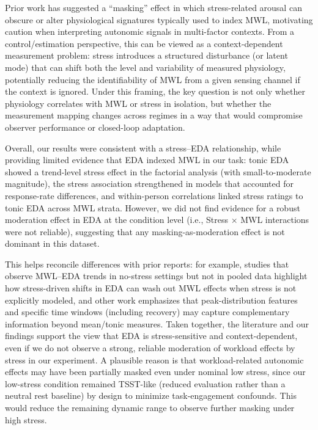 \documentclass[lettersize,journal]{IEEEtran}
\begin{document}
Prior work has suggested a “masking” effect in which stress-related arousal can obscure or alter physiological signatures typically used to index MWL, motivating caution when interpreting autonomic signals in multi-factor contexts. From a control/estimation perspective, this can be viewed as a context-dependent measurement problem: stress introduces a structured disturbance (or latent mode) that can shift both the level and variability of measured physiology, potentially reducing the identifiability of MWL from a given sensing channel if the context is ignored. Under this framing, the key question is not only whether physiology correlates with MWL or stress in isolation, but whether the measurement mapping changes across regimes in a way that would compromise observer performance or closed-loop adaptation.


Overall, our results were consistent with a stress–EDA relationship, while providing limited evidence that EDA indexed MWL in our task: tonic EDA showed a trend-level stress effect in the factorial analysis (with small-to-moderate magnitude), the stress association strengthened in models that accounted for response-rate differences, and within-person correlations linked stress ratings to tonic EDA across MWL strata. However, we did not find evidence for a robust moderation effect in EDA at the condition level (i.e., Stress × MWL interactions were not reliable), suggesting that any masking-as-moderation effect is not dominant in this dataset. 

This helps reconcile differences with prior reports: for example, studies that observe MWL–EDA trends in no-stress settings but not in pooled data highlight how stress-driven shifts in EDA can wash out MWL effects when stress is not explicitly modeled, and other work emphasizes that peak-distribution features and specific time windows (including recovery) may capture complementary information beyond mean/tonic measures. Taken together, the literature and our findings support the view that EDA is stress-sensitive and context-dependent, even if we do not observe a strong, reliable moderation of workload effects by stress in our experiment. A plausible reason is that workload-related autonomic effects may have been partially masked even under nominal low stress, since our low-stress condition remained TSST-like (reduced evaluation rather than a neutral rest baseline) by design to minimize task-engagement confounds. This would reduce the remaining dynamic range to observe further masking under high stress.
\end{document}
